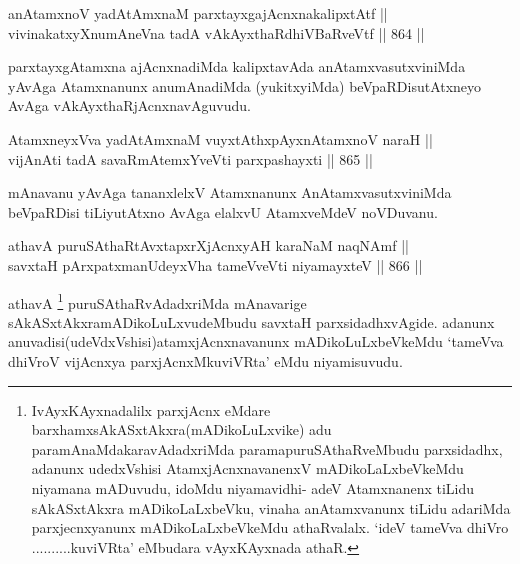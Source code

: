 
\begin{shl}
anAtamxnoV yadA\s \s tAmxnaM parxtayxgajAcnxnakalipxtAtf || \\
vivinakatxyXnumAneVna tadA vAkAyxthaRdhiVBaRveVtf \hfill || 864 ||  
\end{shl}

\begin{artha}
parxtayxgAtamxna ajAcnxnadiMda kalipxtavAda anAtamxvasutxviniMda yAvAga Atamxnanunx anumAnadiMda (yukitxyiMda) beVpaRDisutAtxneyo AvAga vAkAyxthaRjAcnxnavAguvudu.
\end{artha}


\begin{shl}
AtamxneyxVva yadA\s \s tAmxnaM vuyxtAthxpAyxnAtamxnoV naraH || \\
vijAnAti tadA savaRmAtemxYveVti parxpashayxti \hfill || 865 ||  
\end{shl}

\begin{artha}
mAnavanu yAvAga tananxlelxV Atamxnanunx AnAtamxvasutxviniMda beVpaRDisi tiLiyutAtxno AvAga elalxvU AtamxveMdeV noVDuvanu.
\end{artha}


\begin{shl}
athavA puruSAthaRtAvxtapxrXjAcnxyAH karaNaM naqNAmf || \\
savxtaH pArxpatxmanUdeyxVha tameVveVti niyamayxteV \hfill || 866 ||  
\end{shl}

\begin{artha}
athavA \footnote{IvAyxKAyxnadalilx parxjAcnx eMdare barxhamxsAkASxtAkxra(mADikoLuLxvike) adu paramAnaMdakaravAdadxriMda paramapuruSAthaRveMbudu parxsidadhx, adanunx udedxVshisi AtamxjAcnxnavanenxV mADikoLaLxbeVkeMdu niyamana mADuvudu, idoMdu niyamavidhi- adeV Atamxnanenx tiLidu sAkASxtAkxra mADikoLaLxbeVku, vinaha anAtamxvanunx tiLidu adariMda parxjecnxyanunx mADikoLaLxbeVkeMdu athaRvalalx. `ideV tameVva dhiVro ..........kuviVRta' eMbudara vAyxKAyxnada athaR.} puruSAthaRvAdadxriMda mAnavarige sAkASxtAkxramADikoLuLxvudeMbudu savxtaH parxsidadhxvAgide. adanunx anuvadisi(udeVdxVshisi)atamxjAcnxnavanunx mADikoLuLxbeVkeMdu `tameVva dhiVroV vijAcnxya parxjAcnxMkuviVRta' eMdu niyamisuvudu.
\end{artha}

